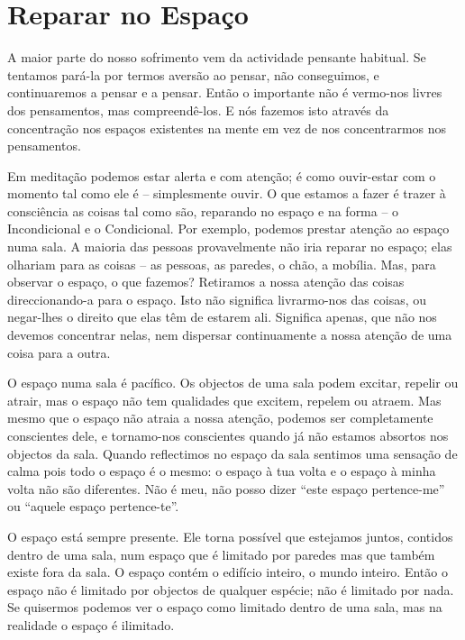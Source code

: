 \chapter{Reparar no Espaço}

A maior parte do nosso sofrimento vem da actividade pensante habitual.
 Se tentamos pará-la por termos aversão ao pensar, não conseguimos, e
continuaremos a pensar e a pensar. Então o importante não é vermo-nos
livres dos pensamentos, mas compreendê-los. E nós fazemos isto através
da concentração nos espaços existentes na mente em vez de nos
concentrarmos nos pensamentos.

Em meditação podemos estar alerta e com atenção; é como ouvir-estar com
o momento tal como ele é -- simplesmente ouvir. O que estamos a fazer é
trazer à consciência as coisas tal como são, reparando no espaço e na
forma -- o Incondicional e o Condicional. Por exemplo, podemos prestar
atenção ao espaço numa sala. A maioria das pessoas provavelmente não
iria reparar no espaço; elas olhariam para as coisas -- as pessoas, as
paredes, o chão, a mobília. Mas, para observar o espaço, o que fazemos?
Retiramos a nossa atenção das coisas direccionando-a para o espaço. Isto
não significa livrarmo-nos das coisas, ou negar-lhes o direito que elas
têm de estarem ali. Significa apenas, que não nos devemos concentrar
nelas, nem dispersar continuamente a nossa atenção de uma coisa para a
outra.

O espaço numa sala é pacífico. Os objectos de uma sala podem excitar,
repelir ou atrair, mas o espaço não tem qualidades que excitem, repelem
ou atraem. Mas mesmo que o espaço não atraia a nossa atenção, podemos
ser completamente conscientes dele, e tornamo-nos conscientes quando já
não estamos absortos nos objectos da sala. Quando reflectimos no espaço
da sala sentimos uma sensação de calma pois todo o espaço é o mesmo: o
espaço à tua volta e o espaço à minha volta não são diferentes. Não é
meu, não posso dizer ``este espaço pertence-me'' ou ``aquele espaço
pertence-te''.

O espaço está sempre presente. Ele torna possível que estejamos juntos,
contidos dentro de uma sala, num espaço que é limitado por paredes mas
que também existe fora da sala. O espaço contém o edifício inteiro, o
mundo inteiro. Então o espaço não é limitado por objectos de qualquer
espécie; não é limitado por nada. Se quisermos podemos ver o espaço como
limitado dentro de uma sala, mas na realidade o espaço é ilimitado.

